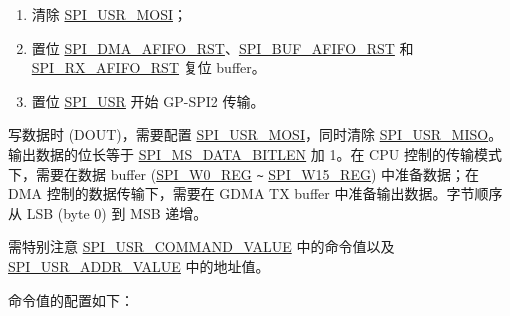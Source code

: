 \documentclass[main\_\_CN.tex]{subfiles}
\begin{document}
\begin{enumerate}
    \item 清除 \hyperref[fielddesc:SPIUSRMOSI]{SPI\_USR\_MOSI}；
    \item 置位 \hyperref[fielddesc:SPIDMAAFIFORST]{SPI\_DMA\_AFIFO\_RST}、\hyperref[fielddesc:SPIBUFAFIFORST]{SPI\_BUF\_AFIFO\_RST} 和 \hyperref[fielddesc:SPIRXAFIFORST]{SPI\_RX\_AFIFO\_RST} 复位 buffer。

    \item 置位 \hyperref[fielddesc:SPIUSR]{SPI\_USR} 开始 GP-SPI2 传输。
\end{enumerate}

写数据时 (DOUT)，需要配置 \hyperref[fielddesc:SPIUSRMOSI]{SPI\_USR\_MOSI}，同时清除 \hyperref[fielddesc:SPIUSRMISO]{SPI\_USR\_MISO}。输出数据的位长等于 \hyperref[fielddesc:SPIMSDATABITLEN]{SPI\_MS\_DATA\_BITLEN} 加 1。在 CPU 控制的传输模式下，需要在数据 buffer (\hyperref[regdesc:SPIW0REG]{SPI\_W0\_REG} \verb+~+ \hyperref[regdesc:SPIW15REG]{SPI\_W15\_REG}) 中准备数据；在 DMA 控制的数据传输下，需要在 GDMA TX buffer 中准备输出数据。字节顺序从 LSB (byte 0) 到 MSB 递增。

需特别注意 \hyperref[fielddesc:SPIUSRCOMMANDVALUE]{SPI\_USR\_COMMAND\_VALUE} 中的命令值以及 \hyperref[fielddesc:SPIUSRADDRVALUE]{SPI\_USR\_ADDR\_VALUE} 中的地址值。

命令值的配置如下：
\end{document}
